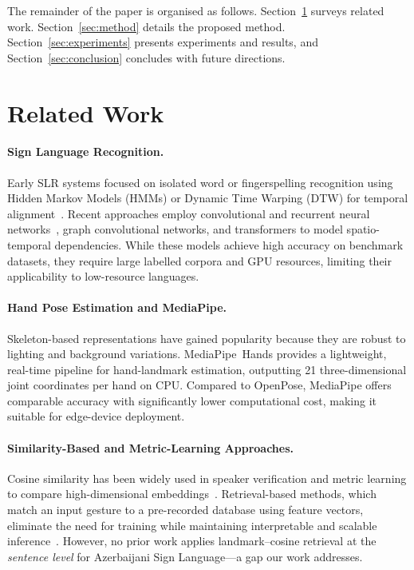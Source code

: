 \documentclass[runningheads]{llncs}
\begin{document}
The remainder of the paper is organised as follows.
Section~\ref{sec:related} surveys related work.
Section~\ref{sec:method} details the proposed method.
Section~\ref{sec:experiments} presents experiments and results, and
Section~\ref{sec:conclusion} concludes with future directions.

\section{Related Work}\label{sec:related}

\paragraph{Sign Language Recognition.}
Early SLR systems focused on isolated word or fingerspelling recognition
using Hidden Markov Models (HMMs) or Dynamic Time Warping (DTW) for
temporal alignment~\cite{fang2013bayesian}.
Recent approaches employ convolutional and recurrent neural
networks~\cite{liu2024skeleton}, graph convolutional
networks, and transformers to model spatio-temporal
dependencies.
While these models achieve high accuracy on benchmark datasets, they
require large labelled corpora and GPU resources, limiting their
applicability to low-resource languages.

\paragraph{Hand Pose Estimation and MediaPipe.}
Skeleton-based representations have gained popularity because they
are robust to lighting and background variations.
MediaPipe~Hands provides a lightweight, real-time pipeline for
hand-landmark estimation, outputting 21 three-dimensional joint
coordinates per hand on CPU.
Compared to OpenPose, MediaPipe offers comparable accuracy with
significantly lower computational cost, making it suitable for
edge-device deployment.

\paragraph{Similarity-Based and Metric-Learning Approaches.}
Cosine similarity has been widely used in speaker verification and
metric learning to compare high-dimensional
embeddings~\cite{dehak2010cosine,zhang2020deep,zhu2020orthogonality}.
Retrieval-based methods, which match an input gesture to a pre-recorded
database using feature vectors, eliminate the need for training while
maintaining interpretable and scalable
inference~\cite{draganov2024hidden,weber2025timepoint}.
However, no prior work applies landmark--cosine retrieval at the
\emph{sentence level} for Azerbaijani Sign Language—a gap our work
addresses.
\end{document}

